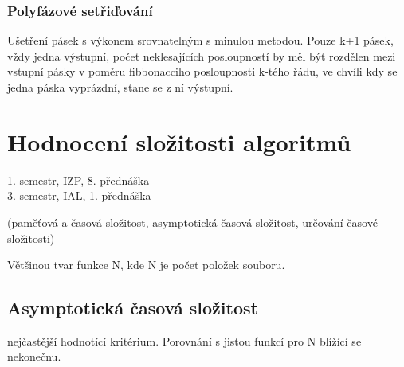 \documentclass[a4paper, 11pt]{report}
\begin{document}
\subsection{Polyfázové setřiďování}

Ušetření pásek s výkonem srovnatelným s minulou metodou. Pouze k+1 pásek, vždy jedna výstupní, počet neklesajících posloupností by měl být rozdělen mezi vstupní pásky v poměru fibbonacciho posloupnosti k-tého řádu, ve chvíli kdy se jedna páska vyprázdní, stane se z ní výstupní.

























\setcounter{chapter}{28}
\chapter{Hodnocení složitosti algoritmů} \label{cha:29}

1. semestr, IZP, 8. přednáška\\
3. semestr, IAL, 1. přednáška

(paměťová a časová složitost, asymptotická časová složitost, určování časové složitosti)


Většinou tvar funkce N, kde N je počet položek souboru.

\section{Asymptotická časová složitost}
nejčastější hodnotící kritérium. Porovnání s jistou funkcí pro N blížící se nekonečnu.
\end{document}
